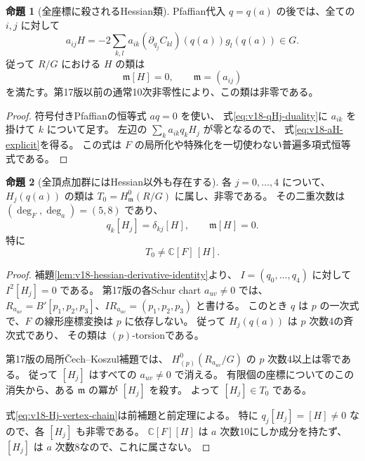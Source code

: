 \documentclass[a4paper,11pt]{ltjsarticle}
\theoremstyle{definition}
\newtheorem{theorem}{命題}[section]
\newtheorem{proposition}[theorem]{命題}
\newcommand{\CC}{\mathbb C}
\begin{document}
\begin{theorem}[全座標に殺されるHessian類]
\label{thm:v18-H-vertex-socle}
Pfaffian代入 $q=q(a)$ の後では、全ての $i,j$ に対して
\begin{equation}\label{eq:v18-aH-explicit}
 a_{ij}H
 =-2\sum_{k,l}a_{ik}(\partial_{q_j}C_{kl})(q(a))g_l(q(a))
 \in G.
\end{equation}
従って $R/G$ における $H$ の類は
\[
 \mathfrak m[H]=0,
 \qquad\mathfrak m=(a_{ij})
\]
を満たす。第17版以前の通常10次非零性により、この類は非零である。
\end{theorem}

\begin{proof}
符号付きPfaffianの恒等式 $aq=0$ を使い、
式\eqref{eq:v18-qHj-duality}に $a_{ik}$ を掛けて $k$ について足す。
左辺の $\sum_k a_{ik}q_kH_j$ が零となるので、
式\eqref{eq:v18-aH-explicit}を得る。
この式は $F$ の局所化や特殊化を一切使わない普遍多項式恒等式である。
\end{proof}

\begin{proposition}[全頂点加群にはHessian以外も存在する]
\label{prop:v18-Hj-vertex-torsion}
各 $j=0,\ldots,4$ について、$H_j(q(a))$ の類は
$T_0=H^0_{\mathfrak m}(R/G)$ に属し、非零である。
その二重次数は $(\deg_F,\deg_a)=(5,8)$ であり、
\begin{equation}\label{eq:v18-Hj-vertex-chain}
 q_k[H_j]=\delta_{kj}[H],\qquad
 \mathfrak m[H]=0.
\end{equation}
特に
\[
 T_0\ne\CC[F]\,[H].
\]
\end{proposition}

\begin{proof}
補題\ref{lem:v18-hessian-derivative-identity}より、
$I=(q_0,\ldots,q_4)$ に対して $I^2[H_j]=0$ である。
第17版の各Schur chart $a_{uv}\ne0$ では、
$R_{a_{uv}}=B'[p_1,p_2,p_3]$、$IR_{a_{uv}}=(p_1,p_2,p_3)$ と書ける。
このとき $q$ は $p$ の一次式で、$F$ の線形座標変換は $p$ に依存しない。
従って $H_j(q(a))$ は $p$ 次数4の斉次式であり、
その類は $(p)$-torsionである。

第17版の局所Čech--Koszul補題では、
$H^0_{(p)}(R_{a_{uv}}/G)$ の $p$ 次数4以上は零である。
従って $[H_j]$ はすべての $a_{uv}\ne0$ で消える。
有限個の座標についてのこの消失から、ある $\mathfrak m$ の冪が $[H_j]$ を殺す。
よって $[H_j]\in T_0$ である。

式\eqref{eq:v18-Hj-vertex-chain}は前補題と前定理による。
特に $q_j[H_j]=[H]\ne0$ なので、各 $[H_j]$ も非零である。
$\CC[F][H]$ は $a$ 次数10にしか成分を持たず、
$[H_j]$ は $a$ 次数8なので、これに属さない。
\end{proof}
\end{document}
